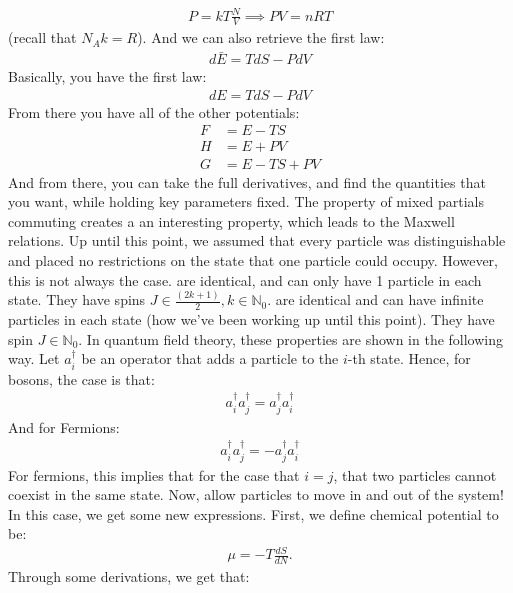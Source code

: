 \documentclass{article}
\begin{document}
\begin{align*}
  P = kT \frac{N}{V} \implies PV = nRT
\end{align*}
(recall that $N_Ak = R$). And we can also retrieve the first law:
\begin{align*}
  d\bar{E} = TdS - PdV
\end{align*}
\vfill\pagebreak 
{}
Basically, you have the first law:
\begin{align*}
  dE = TdS - PdV
\end{align*}
From there you have all of the other potentials:
\begin{align*}
  F &= E - TS\\
  H &= E + PV\\
  G &= E - TS + PV
\end{align*}
And from there, you can take the full derivatives, and find the quantities that you want, while holding key parameters fixed.
\gap
The property of mixed partials commuting creates a an interesting property, which leads to the Maxwell relations.
\gap
{}
Up until this point, we assumed that every particle was distinguishable and placed no restrictions on the state that one particle could occupy. However, this is not always the case.
\gap
{} are identical, and can only have 1 particle in each state. They have spins $J \in {\frac{(2k + 1)}{2}, k \in \mathbb{N}_0}$.
\gap
{} are identical and can have infinite particles in each state (how we've been working up until this point). They have spin $J \in \mathbb{N}_0$.
\gap
In quantum field theory, these properties are shown in the following way. Let $a_i^\dagger$ be an operator that adds a particle to the $i$-th state. Hence, for bosons, the case is that:
\begin{align*}
  a_i^\dagger a_j^\dagger = a_j^\dagger a_i^\dagger
\end{align*}
And for Fermions:
\begin{align*}
  a_i^\dagger a_j^\dagger = -a_j^\dagger a_i^\dagger
\end{align*}
For fermions, this implies that for the case that $i=j$, that two particles cannot coexist in the same state.
\gap
{}
Now, allow particles to move in and out of the system! In this case, we get some new expressions. First, we define chemical potential to be:
\begin{align*}
  \mu = -T \frac{dS}{dN}.
\end{align*}
Through some derivations, we get that:
\end{document}
